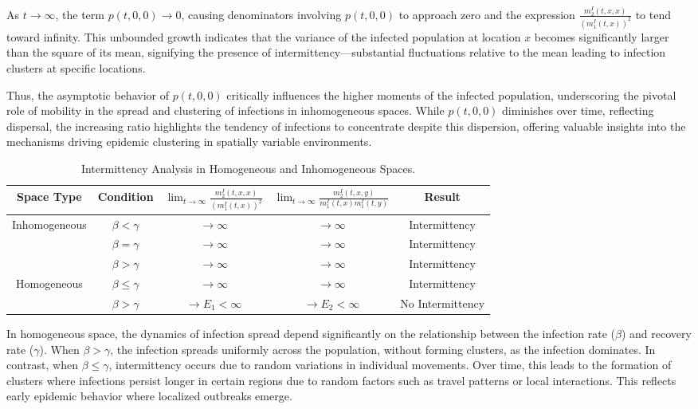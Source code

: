 \documentclass[sn-basic]{sn-jnl}%
\theoremstyle{thmstyleone}%
\theoremstyle{thmstyletwo}%
\theoremstyle{thmstylethree}%
\numberwithin{equation}{theorem}
\begin{document}
As $t \rightarrow \infty$, the term $p(t, 0,0) \rightarrow 0$, causing denominators involving $p(t, 0,0)$ to approach zero and the expression $\frac{m_2^I(t, x, x)}{\left(m_1^I(t, x)\right)^2}$ to tend toward infinity. This unbounded growth indicates that the variance of the infected population at location $x$ becomes significantly larger than the square of its mean, signifying the presence of intermittency—substantial fluctuations relative to the mean leading to infection clusters at specific locations.

Thus, the asymptotic behavior of $p(t, 0,0)$ critically influences the higher moments of the infected population, underscoring the pivotal role of mobility in the spread and clustering of infections in inhomogeneous spaces. While $p(t, 0,0)$ diminishes over time, reflecting dispersal, the increasing ratio highlights the tendency of infections to concentrate despite this dispersion, offering valuable insights into the mechanisms driving epidemic clustering in spatially variable environments.



\begin{table}[ht]
\centering
\begin{tabular}{ | c | c | c | c | c | }
\hline
\textbf{Space Type} & \textbf{Condition} & $\displaystyle \lim_{t \rightarrow \infty} \frac{m_{2}^{I}(t,x,x)}{(m_{1}^{I}(t,x))^{2}}$ & $\displaystyle \lim_{t \rightarrow \infty} \frac{m_{2}^{I}(t,x,y)}{m_{1}^{I}(t,x)m_{1}^{I}(t,y)}$ & \textbf{Result} \\
\hline
\multirow{3}{*}{Inhomogeneous} & $\beta < \gamma$ &  $\rightarrow \infty$ & $\rightarrow \infty$ & Intermittency \\ 
& $\beta = \gamma$ & $\rightarrow \infty$ & $\rightarrow \infty$ & Intermittency\\
& $\beta >  \gamma$ & $\rightarrow \infty$ & $\rightarrow \infty$ & Intermittency \\
\hline
\multirow{2}{*}{Homogeneous} & $\beta \leq \gamma$ &  $\rightarrow \infty$ & $\rightarrow \infty$ & Intermittency \\ 
& $\beta >  \gamma$ & $\rightarrow E_{1} < \infty$ & $\rightarrow E_{2} < \infty$ & No Intermittency \\
\hline
\end{tabular}
\caption{Intermittency Analysis in Homogeneous and Inhomogeneous Spaces.}
\label{tab:intermittency_analysis_merged}
\end{table}

In homogeneous space, the dynamics of infection spread depend significantly on the relationship between the infection rate ($\beta$) and recovery rate ($\gamma$). When $\beta>\gamma$, the infection spreads uniformly across the population, without forming clusters, as the infection dominates. In contrast, when $\beta\leq \gamma$, intermittency occurs due to random variations in individual movements. Over time, this leads to the formation of clusters where infections persist longer in certain regions due to random factors such as travel patterns or local interactions. This reflects early epidemic behavior where localized outbreaks emerge.
\end{document}

